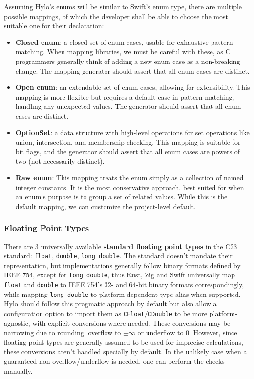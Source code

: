 Assuming Hylo's enums will be similar to Swift's enum type, there are multiple possible mappings, of which the developer shall be able to choose the most suitable one for their declaration:
\begin{itemize}
    \item \textbf{Closed enum}: a closed set of enum cases, usable for exhaustive pattern matching. When mapping libraries, we must be careful with these, as C programmers generally think of adding a new enum case as a non-breaking change. The mapping generator should assert that all enum cases are distinct.
    \item \textbf{Open enum}: an extendable set of enum cases, allowing for extensibility. This mapping is more flexible but requires a default case in pattern matching, handling any unexpected values. The generator should assert that all enum cases are distinct.
    \item \textbf{OptionSet}: a data structure with high-level operations for set operations like union, intersection, and membership checking. This mapping is suitable for bit flags, and the generator should assert that all enum cases are powers of two (not necessarily distinct).
    \item \textbf{Raw enum}: This mapping treats the enum simply as a collection of named integer constants. It is the most conservative approach, best suited for when an enum's purpose is to group a set of related values. While this is the default mapping, we can customize the project-level default.
\end{itemize}

\subsubsection{Floating Point Types}
There are 3 universally available \textbf{standard floating point types} in the C23 standard: \texttt{float}, \texttt{double}, \texttt{long double}. The standard doesn't mandate their representation, but implementations generally follow\cite{llvm-float-support} binary formats defined by IEEE 754\cite{ieee754}, except for \texttt{long double}\cite{longdouble-wiki}\cite{weird-precision-support}, thus Rust, Zig and Swift universally map \texttt{float} and \texttt{double} to IEEE 754's 32- and 64-bit binary formats correspondingly, while mapping \texttt{long double} to platform-dependent type-alias when supported. Hylo should follow this pragmatic approach by default but also allow a configuration option to import them as \texttt{CFloat}/\texttt{CDouble} to be more platform-agnostic, with explicit conversions where needed. These conversions may be narrowing due to rounding, overflow to $\pm\infty$ or underflow to 0. However, since floating point types are generally assumed to be used for imprecise calculations, these conversions aren't handled specially by default. In the unlikely case when a guaranteed non-overflow/underflow is needed, one can perform the checks manually.

